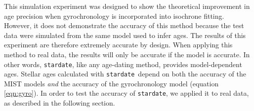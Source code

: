 \documentclass[useAMS, usenatbib, preprint, 12pt]{aastex}
\newcommand{\sd}{{\tt stardate}}
\begin{document}

This simulation experiment was designed to show the theoretical improvement in
age precision when gyrochronology is incorporated into isochrone fitting.
However, it does not demonstrate the accuracy of this method because the test
data were simulated from the same model used to infer ages.
The results of this experiment are therefore extremely accurate by design.
When applying this method to real data, the results will only be accurate if
the model is accurate.
In other words, \sd, like any age-dating method, provides model-dependent
ages.
Stellar ages calculated with \sd\ depend on both the accuracy of the MIST
models {\it and} the accuracy of the gyrochronology model (equation
\ref{eqn:gyro}).
In order to test the accuracy of \sd, we applied it to real data, as described
in the following section.
\end{document}
